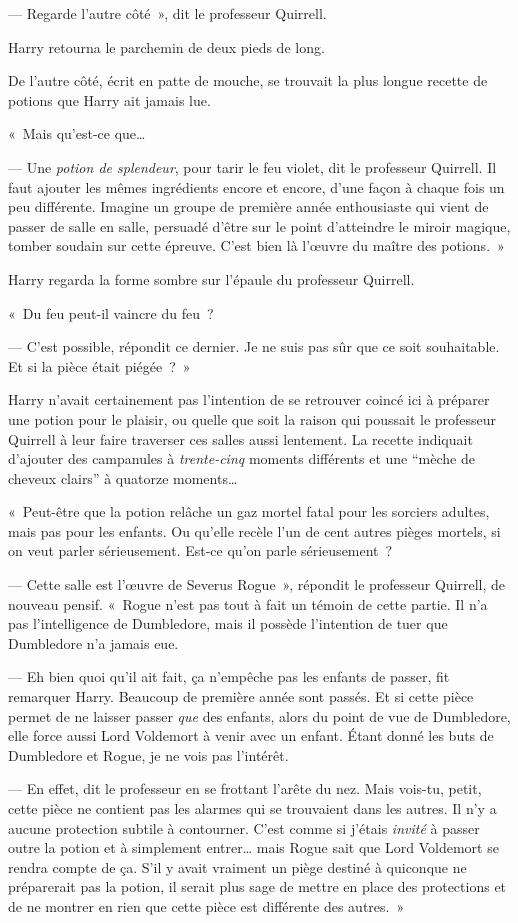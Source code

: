 --- Regarde l'autre côté~», dit le professeur Quirrell.

Harry retourna le parchemin de deux pieds de long.

De l'autre côté, écrit en patte de mouche, se trouvait la plus longue recette de potions que Harry ait jamais lue.

«~Mais qu'est-ce que…

--- Une \emph{potion de splendeur}, pour tarir le feu violet, dit le professeur Quirrell. Il faut ajouter les mêmes ingrédients encore et encore, d'une façon à chaque fois un peu différente. Imagine un groupe de première année enthousiaste qui vient de passer de salle en salle, persuadé d'être sur le point d'atteindre le miroir magique, tomber soudain sur cette épreuve. C'est bien là l'œuvre du maître des potions.~»

Harry regarda la forme sombre sur l'épaule du professeur Quirrell.

«~Du feu peut-il vaincre du feu~?

--- C'est possible, répondit ce dernier. Je ne suis pas sûr que ce soit souhaitable. Et si la pièce était piégée~?~»

Harry n'avait certainement pas l'intention de se retrouver coincé ici à préparer une potion pour le plaisir, ou quelle que soit la raison qui poussait le professeur Quirrell à leur faire traverser ces salles aussi lentement. La recette indiquait d'ajouter des campanules à \emph{trente-cinq} moments différents et une “mèche de cheveux clairs” à quatorze moments…

«~Peut-être que la potion relâche un gaz mortel fatal pour les sorciers adultes, mais pas pour les enfants. Ou qu'elle recèle l'un de cent autres pièges mortels, si on veut parler sérieusement. Est-ce qu'on parle sérieusement~?

--- Cette salle est l'œuvre de Severus Rogue~», répondit le professeur Quirrell, de nouveau pensif. «~Rogue n'est pas tout à fait un témoin de cette partie. Il n'a pas l'intelligence de Dumbledore, mais il possède l'intention de tuer que Dumbledore n'a jamais eue.

--- Eh bien quoi qu'il ait fait, ça n'empêche pas les enfants de passer, fit remarquer Harry. Beaucoup de première année sont passés. Et si cette pièce permet de ne laisser passer \emph{que} des enfants, alors du point de vue de Dumbledore, elle force aussi Lord Voldemort à venir avec un enfant. Étant donné les buts de Dumbledore et Rogue, je ne vois pas l'intérêt.

--- En effet, dit le professeur en se frottant l'arête du nez. Mais vois-tu, petit, cette pièce ne contient pas les alarmes qui se trouvaient dans les autres. Il n'y a aucune protection subtile à contourner. C'est comme si j'étais \emph{invité} à passer outre la potion et à simplement entrer… mais Rogue sait que Lord Voldemort se rendra compte de ça. S'il y avait vraiment un piège destiné à quiconque ne préparerait pas la potion, il serait plus sage de mettre en place des protections et de ne montrer en rien que cette pièce est différente des autres.~»

